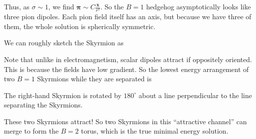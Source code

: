 \documentclass[a4paper]{article}
\begin{document}
Thus, as $ \sigma \sim 1$, we find $\boldsymbol\pi \sim C \frac{\mathbf{x}}{r^3}$. So the $B = 1$ hedgehog asymptotically looks like three pion dipoles. Each pion field itself has an axis, but because we have three of them, the whole solution is spherically symmetric.

We can roughly sketch the Skyrmion as
\begin{center}
\end{center}
Note that unlike in electromagnetism, scalar dipoles attract if oppositely oriented. This is because the fields have low gradient. So the lowest energy arrangement of two $B = 1$ Skyrmions while they are separated is

\begin{center}
\end{center}
The right-hand Skyrmion is rotated by $180^\circ$ about a line perpendicular to the line separating the Skyrmions.

These two Skyrmions attract! So two Skyrmions in this ``attractive channel'' can merge to form the $B = 2$ torus, which is the true minimal energy solution.
\end{document}

